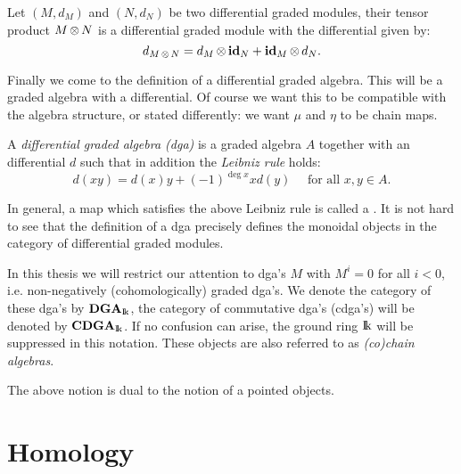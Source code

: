 \begin{definition}
	Let $(M, d_M)$ and $(N, d_N)$ be two differential graded modules, their tensor product $M \operatorname*{\otimes} N$ is a differential graded module with the differential given by:
	$$ d_{M \operatorname*{\otimes} N} = d_M \operatorname*{\otimes} \mathbf{id}_N + \mathbf{id}_M \operatorname*{\otimes} d_N. $$
\end{definition}

Finally we come to the definition of a differential graded algebra. This will be a graded algebra with a differential. Of course we want this to be compatible with the algebra structure, or stated differently: we want $\mu$ and $\eta$ to be chain maps.

\begin{definition}
	A \emph{differential graded algebra (dga)} is a graded algebra $A$ together with an differential $d$ such that in addition the \emph{Leibniz rule} holds:
	$$ d(x y) = d(x) y + (-1)^{\deg{x}} x d(y) \quad\text{ for all } x, y \in A. $$
\end{definition}

In general, a map which satisfies the above Leibniz rule is called a . It is not hard to see that the definition of a dga precisely defines the monoidal objects in the category of differential graded modules.

In this thesis we will restrict our attention to dga's $M$ with $M^i = 0 $ for all $i < 0$, i.e. non-negatively (cohomologically) graded dga's. We denote the category of these dga's by $\mathbf{DGA}_{\mathrm{I\!k}}$, the category of commutative dga's (cdga's) will be denoted by $\mathbf{CDGA}_{\mathrm{I\!k}}$. If no confusion can arise, the ground ring $\mathrm{I\!k}$ will be suppressed in this notation. These objects are also referred to as \emph{(co)chain algebras}.


The above notion is dual to the notion of a pointed objects.




\section{Homology}

